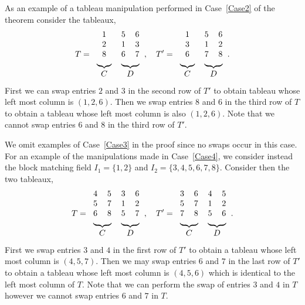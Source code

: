\begin{exam}
As an example of a tableau manipulation performed in Case~\ref{Case2} of the theorem consider the tableaux, 
\[
T = 
\begin{tabular}{ccc}
 1 & 5 & 6 \\
 2 & 1 & 3 \\
 8 & 6 & 7 \\
 \multicolumn{1}{c}{\upbracefill} & \multicolumn{2}{c}{\upbracefill}\\
 \multicolumn{1}{c}{$C$} & \multicolumn{2}{c}{$D$}\\
\end{tabular},
\quad
T' = 
\begin{tabular}{ccc}
 1 & 5 & 6 \\
 3 & 1 & 2 \\
 6 & 7 & 8 \\
 \multicolumn{1}{c}{\upbracefill} & \multicolumn{2}{c}{\upbracefill}\\
 \multicolumn{1}{c}{$C$} & \multicolumn{2}{c}{$D$}\\
\end{tabular}.
\]
First we can swap entries $2$ and $3$ in the second row of $T'$ to obtain tableau whose left most column is $(1,2,6)$. Then we swap entries $8$ and $6$ in the third row of $T$ to obtain a tableau whose left most column is also $(1,2,6)$. Note that we cannot swap entries $6$ and $8$ in the third row of $T'$.

\medskip
We omit examples of Case~\ref{Case3} in the proof since no swaps occur in this case. For an example of the manipulations made in Case~\ref{Case4}, we consider instead the block matching field 
$I_1 = \{1, 2\}$ and $I_2 = \{3,4,5,6,7,8 \}$. Consider then the two tableaux, 
\[
T = 
\begin{tabular}{cccc}
 4 & 5 & 3 & 6 \\
 5 & 7 & 1 & 2 \\
 6 & 8 & 5 & 7 \\
 \multicolumn{2}{c}{\upbracefill} & \multicolumn{2}{c}{\upbracefill}\\
 \multicolumn{2}{c}{$C$} & \multicolumn{2}{c}{$D$}\\
\end{tabular},
\quad
T' = 
\begin{tabular}{cccc}
 3 & 6 & 4 & 5 \\
 5 & 7 & 1 & 2 \\
 7 & 8 & 5 & 6 \\
 \multicolumn{2}{c}{\upbracefill} & \multicolumn{2}{c}{\upbracefill}\\
 \multicolumn{2}{c}{$C$} & \multicolumn{2}{c}{$D$}\\
\end{tabular}.
\]
First we swap entries $3$ and $4$ in the first row of $T'$ to obtain a tableau whose left most column is $(4,5,7)$. Then we may swap entries $6$ and $7$ in the last row of $T'$ to obtain a tableau whose left most column is $(4,5,6)$ which is identical to the left most column of $T$. Note that we can perform the swap of entries $3$ and $4$ in $T$ however we cannot swap entries $6$ and $7$ in $T$. 

\end{exam}
